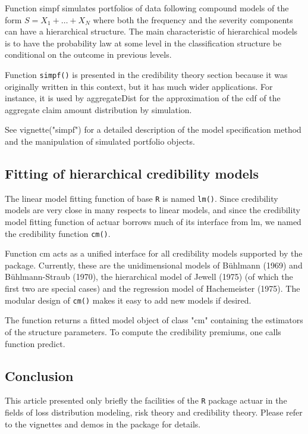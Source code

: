 \documentclass[12pt]{article}
\begin{document}
Function simpf simulates portfolios of data following compound models of the form $S = X_1 + \ldots + X_N$ where both the frequency and the severity components can have a hierarchical structure. The main characteristic of hierarchical models is to have the probability law at some level in the classification structure be conditional on the outcome in previous levels.

Function \texttt{simpf()} is presented in the credibility theory section because it was originally written in this context, but it has much wider applications. For instance, it is used by aggregateDist for the approximation of the cdf of the aggregate claim amount distribution by simulation.

See vignette("simpf") for a detailed description of the model specification method and the manipulation of simulated portfolio objects.

\subsection{Fitting of hierarchical credibility models}

The linear model fitting function of base \texttt{R} is named \texttt{lm()}. Since credibility models are very close in many respects to linear models, and since the credibility model fitting function of actuar borrows much of its interface from lm, we named the credibility function \texttt{cm()}.

Function cm acts as a unified interface for all credibility models supported by the package. Currently, these are the unidimensional models of Bühlmann (1969) and Bühlmann-Straub (1970), the hierarchical model of Jewell (1975) (of which the first two are special cases) and the regression model of Hachemeister (1975). The modular design of \texttt{cm()} makes it easy to add new models if desired.

The function returns a fitted model object of class "cm" containing the estimators of the structure parameters. To compute the credibility premiums, one calls function predict.

\subsection{Conclusion}

This article presented only briefly the facilities of the \texttt{R} package actuar in the fields of loss distribution modeling, risk theory and credibility theory. Please refer to the vignettes and demos in the package for details.
\end{document}
